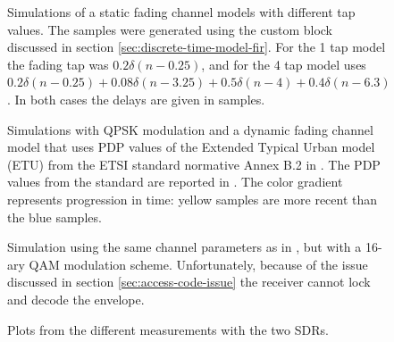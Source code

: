 \begin{figure}
	\centering
	\label{fig:qpsk-simulations-static}
	
	\caption{
		Simulations of a static fading channel models with different tap values. The samples were generated using the custom block discussed in section \ref{sec:discrete-time-model-fir}. For the 1 tap model the fading tap was \(0.2\delta(n - 0.25)\), and for the 4 tap model uses \(0.2 \delta(n - 0.25) + 0.08 \delta(n - 3.25) + 0.5 \delta(n - 4) + 0.4 \delta(n - 6.3)\). In both cases the delays are given in samples.
	}
\end{figure}
\newpage
\begin{figure}
	\centering
	
	\caption{
		Simulations with QPSK modulation and a dynamic fading channel model that uses PDP values of the Extended Typical Urban model (ETU) from the ETSI standard normative Annex B.2 in \cite{ETSI}. The PDP values from the standard are reported in . The color gradient represents progression in time: yellow samples are more recent than the blue samples.
		\label{fig:qpsk-simulations-dynamic}
	}
\end{figure}
\newpage
\begin{figure}
	\centering
	
	\caption{
		Simulation using the same channel parameters as in , but with a 16-ary QAM modulation scheme. Unfortunately, because of the issue discussed in section \ref{sec:access-code-issue} the receiver cannot lock and decode the envelope.
	}
\end{figure}
\begin{figure}
	\centering
	
	\caption{
		Plots from the different measurements with the two SDRs.
	\label{fig:hardware-mesurement}
	}
\end{figure}
\newpage
\restoregeometry


